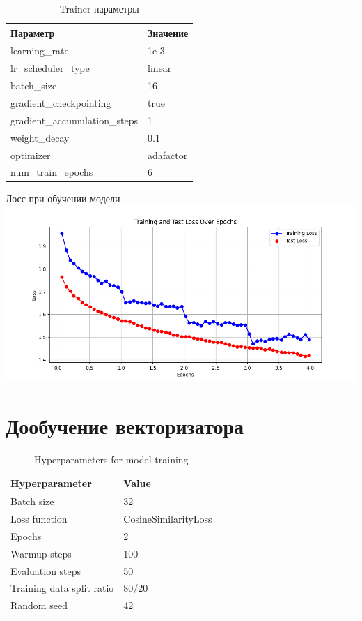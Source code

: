 \begin{longtable}{ll}
\caption{Trainer параметры} \\
\hline
\textbf{Параметр} & \textbf{Значение} \\
\hline
learning\_rate & 1e-3 \\
lr\_scheduler\_type & linear \\
batch\_size & 16 \\
gradient\_checkpointing & true \\
gradient\_accumulation\_steps & 1 \\
weight\_decay & 0.1 \\
optimizer & adafactor \\
num\_train\_epochs & 6 \\
\hline
\end{longtable}

\begin{FIGURE}[h]{Лосс при обучении модели \label{fig:loss-plot-epoch}}
\includegraphics[width=1.0\textwidth]{img/loss-plot-epoch}
\end{FIGURE}

\chapter{Дообучение векторизатора}

\begin{table}[H]
\centering
\begin{tabular}{|l|l|}
\hline
\textbf{Hyperparameter}    & \textbf{Value} \\ \hline
Batch size                 & 32    \\ \hline
Loss function              & CosineSimilarityLoss \\ \hline
Epochs                     & 2     \\ \hline
Warmup steps               & 100   \\ \hline
Evaluation steps           & 50    \\ \hline
Training data split ratio  & 80/20 \\ \hline
Random seed                & 42    \\ \hline
\end{tabular}
\caption{Hyperparameters for model training}
\label{tab:hyperparameters}
\end{table}
